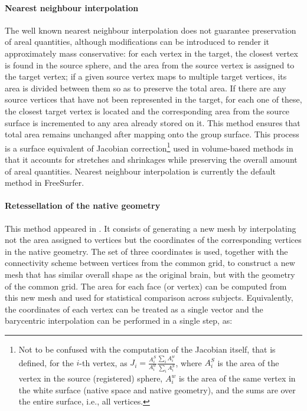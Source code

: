 \paragraph{Nearest neighbour interpolation}

The well known nearest neighbour interpolation does not guarantee preservation of areal quantities, although modifications can be introduced to render it approximately mass conservative: for each vertex in the target, the closest vertex is found in the source sphere, and the area from the source vertex is assigned to the target vertex; if a given source vertex maps to multiple target vertices, its area is divided between them so as to preserve the total area. If there are any source vertices that have not been represented in the target, for each one of these, the closest target vertex is located and the corresponding area from the source surface is incremented to any area already stored on it. This method ensures that total area remains unchanged after mapping onto the group surface.  This process is a surface equivalent of Jacobian correction\footnote{Not to be confused with the computation of the Jacobian itself, that is defined, for the $i$-th vertex, as $J_i = \frac{A^S_i}{A^w_i}\frac{\sum_i A^w_i}{\sum_i A^S_i}$, where $A^S_i$ is the area of the vertex in the source (registered) sphere, $A^w_i$ is the area of the same vertex in the white surface (native space and native geometry), and the sums are over the entire surface, i.e., all vertices.} used in volume-based methods in that it accounts for stretches and shrinkages while preserving the overall amount of areal quantities. Nearest neighbour interpolation is currently the default method in FreeSurfer.

\paragraph{Retessellation of the native geometry}

This method appeared in \citet{Saad2004}. It consists of generating a new mesh by interpolating not the area assigned to vertices but the coordinates of the corresponding vertices in the native geometry. The set of three coordinates is used, together with the connectivity scheme between vertices from the common grid, to construct a new mesh that has similar overall shape as the original brain, but with the geometry of the common grid. The area for each face (or vertex) can be computed from this new mesh and used for statistical comparison across subjects. Equivalently, the coordinates of each vertex can be treated as a single vector and the barycentric interpolation can be performed in a single step, as:

